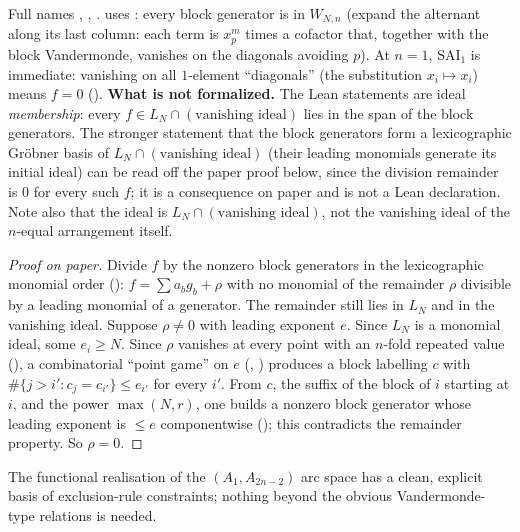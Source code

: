 \begin{dictionary}
Full names , , .
 uses : every block generator is in $W_{N,n}$
(expand the alternant along its last column: each term is $x_{p}^m$ times a cofactor that, together with the block
Vandermonde, vanishes on the diagonals avoiding $p$). At $n=1$, $\mathrm{SAI}_1$ is immediate: vanishing on all
$1$-element ``diagonals'' (the substitution $x_i\mapsto x_i$) means $f=0$ ().
\textbf{What is not formalized.} The Lean statements are ideal \emph{membership}: every $f\in L_N\cap(\text{vanishing ideal})$ lies in
the span of the block generators. The stronger statement that the block generators form a lexicographic Gr\"obner basis of
$L_N\cap(\text{vanishing ideal})$ (their leading monomials generate its initial ideal) can be read off the paper proof below, since the
division remainder is $0$ for every such $f$; it is a consequence on paper and is not a Lean declaration. Note also that the ideal is
$L_N\cap(\text{vanishing ideal})$, not the vanishing ideal of the $n$-equal arrangement itself.
\end{dictionary}

\begin{proof}[Proof on paper]
Divide $f$ by the nonzero block generators in the lexicographic monomial order (): $f=\sum
a_bg_b+\rho$ with no monomial of the remainder $\rho$ divisible by a leading monomial of a generator. The remainder
still lies in $L_N$ and in the vanishing ideal. Suppose $\rho\ne0$ with leading exponent $e$. Since $L_N$ is a monomial
ideal, some $e_i\ge N$. Since $\rho$ vanishes at every point with an $n$-fold repeated value (),
a combinatorial ``point game'' on $e$ (, ) produces a block
labelling $c$ with $\#\{j>i':c_j=c_{i'}\}\le e_{i'}$ for every $i'$. From $c$, the suffix of the block of $i$ starting at
$i$, and the power $\max(N,r)$, one builds a nonzero block generator whose leading exponent is $\le e$ componentwise
(); this contradicts the remainder property. So $\rho=0$.
\end{proof}

\begin{physics}
The functional realisation of the $(A_1,A_{2n-2})$ arc space has a clean, explicit basis of exclusion-rule
constraints; nothing beyond the obvious Vandermonde-type relations is needed.
\end{physics}

